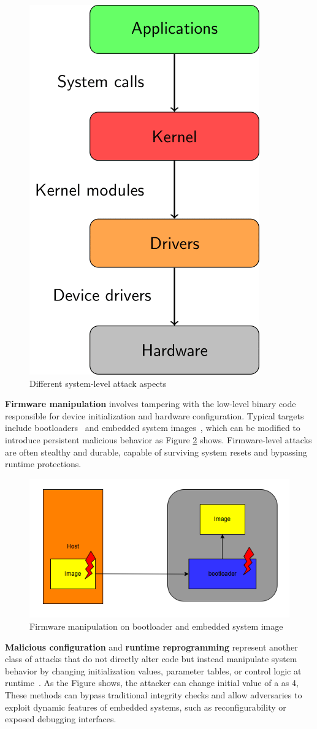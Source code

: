 \begin{figure}[t!]
  \centering
  \includegraphics[width=0.5\linewidth]{Chapitre1/figures/system.png}
  \caption{Different system-level attack aspects}
  \label{system}
\end{figure}

\textbf{Firmware manipulation} involves tampering with the low-level binary code responsible for device initialization and hardware configuration. Typical targets include bootloaders~\cite{redini2017bootstomp} and embedded system images~\cite{ling2023adversarial}, which can be modified to introduce persistent malicious behavior as Figure \ref{Firmware} shows. Firmware-level attacks are often stealthy and durable, capable of surviving system resets and bypassing runtime protections.

\begin{figure}[t!]
  \centering
  \includegraphics[width=0.5\linewidth]{Chapitre1/figures/Firmware.png}
  \caption{Firmware manipulation on bootloader and embedded system image}
  \label{Firmware}
\end{figure}

\textbf{Malicious configuration} and \textbf{runtime reprogramming} represent another class of attacks that do not directly alter code but instead manipulate system behavior by changing initialization values, parameter tables, or control logic at runtime~\cite{sinanovic2017analysis, alam2020soft}. As the Figure shows, the attacker can change initial value of a as 4,  These methods can bypass traditional integrity checks and allow adversaries to exploit dynamic features of embedded systems, such as reconfigurability or exposed debugging interfaces.

